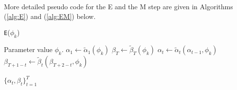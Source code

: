 %
%
More detailed pseudo code for the E and the M step are given in Algorithms (\ref{alg:E}) and (\ref{alg:EM}) below.

\begin{algorithm}
\caption{\texttt{E}($\phi_k$)}\label{alg:E}
\begin{algorithmic}[1]
\Require Parameter value $\phi_k$.
%
\State $\alpha_1 \gets \tilde \alpha_1(\phi_k)$
\State $\beta_T \gets \tilde \beta_T(\phi_k)$
    \State $\alpha_t \gets \tilde \alpha_t(\alpha_{t-1},\phi_k)$
    \State $\beta_{T+1-t} \gets \tilde \beta_t(\beta_{T+2-t},\phi_k)$
\EndFor

\State \Return $\{\alpha_t,\beta_t\}_{t=1}^T$
\end{algorithmic}
\end{algorithm}


